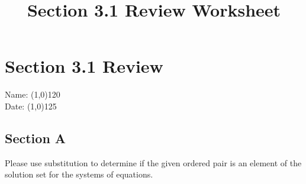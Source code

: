 \documentclass{article}
\begin{document}
\title{Section 3.1 Review Worksheet}

\section*{Section 3.1 Review} %
Name: \line(1,0){120} %
\\Date: \line(1,0){125}


\subsection*{Section A}
Please use substitution to determine if the given ordered pair is an element of the solution set for the systems of equations.
\end{document}
